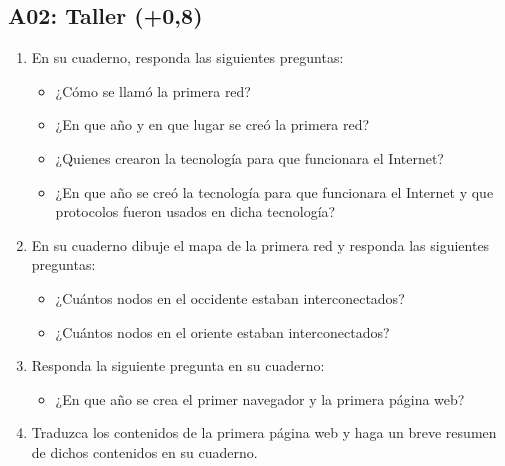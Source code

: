 \documentclass[letterpaper,10pt,spanish]{sphinxmanual}
\begin{document}
\subsection{A02: Taller (+0,8)}
\label{\detokenize{1_guias/10informatica/G1001:a02-taller-0-8}}
\sphinxAtStartPar
{}
\begin{enumerate}
%
\item {} 
\sphinxAtStartPar
En su cuaderno, responda las siguientes preguntas:
\begin{itemize}
\item {} 
\sphinxAtStartPar
¿Cómo se llamó la primera red?

\item {} 
\sphinxAtStartPar
¿En que año y en que lugar se creó la primera red?

\item {} 
\sphinxAtStartPar
¿Quienes crearon la tecnología para que funcionara el Internet?

\item {} 
\sphinxAtStartPar
¿En que año se creó la tecnología para que funcionara el Internet y que protocolos fueron usados en dicha tecnología?

\end{itemize}

\item {} 
\sphinxAtStartPar
En su cuaderno dibuje el mapa de la primera red y responda las siguientes preguntas:
\begin{itemize}
\item {} 
\sphinxAtStartPar
¿Cuántos nodos en el occidente estaban interconectados?

\item {} 
\sphinxAtStartPar
¿Cuántos nodos en el oriente estaban interconectados?

\end{itemize}

\item {} 
\sphinxAtStartPar
Responda la siguiente pregunta en su cuaderno:
\begin{itemize}
\item {} 
\sphinxAtStartPar
¿En que año se crea el primer navegador y la primera página web?

\end{itemize}

\item {} 
\sphinxAtStartPar
Traduzca los contenidos de la primera página web y haga un breve resumen de dichos contenidos en su cuaderno.


\end{enumerate}
\end{document}
